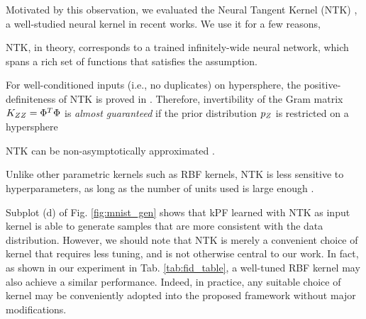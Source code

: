 Motivated by this observation, we evaluated the Neural Tangent Kernel (NTK) \citep{jacot2018NTK}, a well-studied neural kernel in recent works. We use it for a 
few reasons, 
\begin{inparaenum}[\bfseries (a)] \item NTK, in theory, corresponds to a trained infinitely-wide neural network, which spans a rich set of functions that satisfies the assumption. 
\item For well-conditioned inputs (i.e., no duplicates) on hypersphere,
  the positive-definiteness of NTK is proved in \citep{jacot2018NTK}. Therefore, invertibility of the Gram matrix $K_{\var{z}\var{z}} = \Phi^T\Phi$ is \textit{almost guaranteed} if the prior distribution $p_{\var{z}}$ is restricted on a hypersphere
\item
  NTK can be non-asymptotically approximated \citep{arora2019onexact}.
\item Unlike other parametric kernels such as RBF kernels, NTK is less sensitive to hyperparameters, as long as the number of units used is large enough \citep{arora2019onexact}.
\end{inparaenum} Subplot (d) of Fig. \ref{fig:mnist_gen} shows that kPF learned with NTK as input kernel is able to generate samples that are more consistent with the data distribution. However, we should note that NTK is merely a convenient choice of kernel that requires less tuning, and is not otherwise central to our work. In fact, as shown in our experiment in Tab. \ref{tab:fid_table}, a well-tuned RBF kernel may also achieve a similar performance. Indeed, in practice, any suitable choice of kernel may be conveniently adopted into the proposed framework without major modifications.

\begin{figure*}[h]
    \centering
    \textcolor{red!50!white}{\fboxrule=1pt}
    \textcolor{blue!50!white}{\fboxrule=1pt}
    \caption{\footnotesize 10k samples from MNIST dataset ({\it left to right}) (a) projected on $\mathbf{S}^2$ shown in $(\theta, \phi)$ using auto-encoder, and 10K generated samples from kPF with input kernel of type (b) RBF (c) arccos (d) NTK. Color of sampled points represents the class of their nearest training set neighbor in the output RKHS.}  \label{fig:mnist_gen}
\end{figure*}

